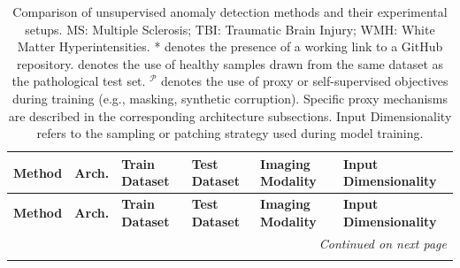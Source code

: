 \begin{longtable}{p{4.2cm}p{1.3cm}p{3.2cm}p{3cm}p{4cm}p{3.3cm}}
\caption{Comparison of unsupervised anomaly detection methods and their experimental setups.
MS: Multiple Sclerosis; TBI: Traumatic Brain Injury; WMH: White Matter Hyperintensities.
* denotes the presence of a working link to a GitHub repository.  
 denotes the use of healthy samples drawn from the same dataset as the pathological test set.
$^{\mathcal{P}}$ denotes the use of proxy or self-supervised objectives during training (e.g., masking, synthetic corruption). Specific proxy mechanisms are described in the corresponding architecture subsections.
Input Dimensionality refers to the sampling or patching strategy used during model training.
}
\label{tab:method_summary}
\\
\toprule
\textbf{Method} & \textbf{Arch.} & \textbf{Train Dataset} & \textbf{Test Dataset} & \textbf{Imaging Modality} & \textbf{Input Dimensionality} \\
\midrule
\endfirsthead
\toprule
\textbf{Method} & \textbf{Arch.} & \textbf{Train Dataset} & \textbf{Test Dataset} & \textbf{Imaging Modality} & \textbf{Input Dimensionality} \\
\midrule
\endhead
\midrule
\multicolumn{6}{r}{\textit{Continued on next page}} \\
\midrule
\endfoot
\bottomrule
\endlastfoot


\end{longtable}

